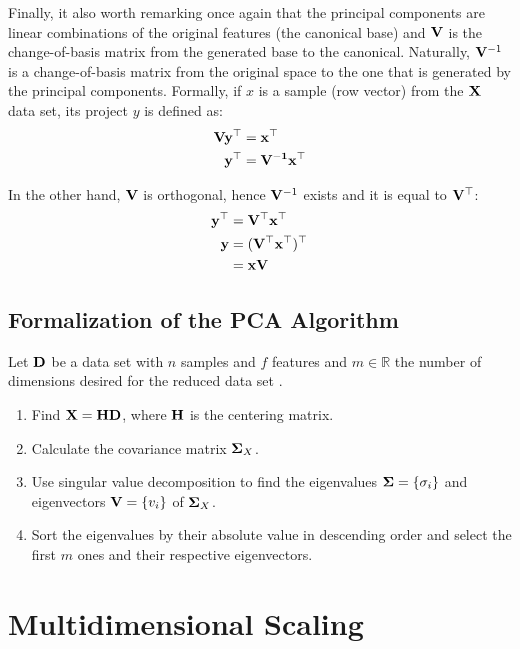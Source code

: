 Finally, it also worth remarking once again that the principal components are linear combinations of the original features (the canonical base) and $\mathbf{V}$ is the change-of-basis matrix from the generated base to the canonical. Naturally, $\mathbf{V}^{-1}$ is a change-of-basis matrix from the original space to the one that is generated by the principal components. Formally, if $x$ is a sample (row vector) from the $\mathbf{X}$ data set, its project $y$ is defined as:
\begin{align*}
	\mathbf{V y^\top} &= \mathbf{x}^\top \\
	\mathbf{y}^\top  &= \mathbf{V^{-1}x^\top}
\end{align*}

In the other hand, $\mathbf{V}$ is orthogonal, hence $\mathbf{V}^{-1}$ exists and it is equal to $\mathbf{V}^\top$:
\begin{align*}
	\mathbf{y}^\top &= \mathbf{V^\top x^\top} \\
	\mathbf{y} &= \mathbf{(V^\top x^\top)^\top} \\
      &= \mathbf{xV}
\end{align*}

\subsection{Formalization of the PCA Algorithm}

Let $\mathbf{D}$ be a data set with $n$ samples and $f$ features and $m\in\mathbb{R}$ the number of dimensions desired for the reduced data set \cite{pca2002, pcapy}.

\begin{enumerate}
	\item Find $\mathbf{X=HD}$, where $\mathbf{H}$ is the centering matrix.

	\item Calculate the covariance matrix $\mathbf{\Sigma}_X$.

	\item Use singular value decomposition to find the eigenvalues $\mathbf{\Sigma} = \{\sigma_i\}$ and eigenvectors $\mathbf{V} = \{v_i\}$ of $\mathbf{\Sigma}_X$.

	\item Sort the eigenvalues by their absolute value in descending order and select the first $m$ ones and their respective eigenvectors.
\end{enumerate}

\section{Multidimensional Scaling}

